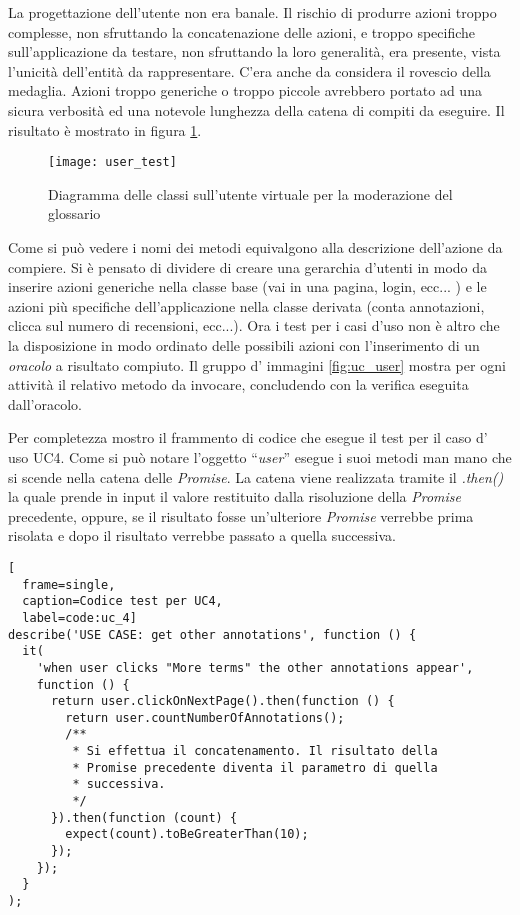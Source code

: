 La progettazione dell'utente non era banale. Il rischio di produrre azioni
troppo complesse, non sfruttando la concatenazione delle azioni, e troppo
specifiche sull'applicazione da testare, non sfruttando la loro generalità,
era presente, vista l'unicità dell'entità da rappresentare. C'era anche da
considera il rovescio della medaglia. Azioni troppo generiche o troppo piccole
avrebbero portato ad una sicura verbosità ed una notevole lunghezza della catena
di compiti da eseguire. Il risultato è mostrato in figura \ref{fig:user_test}.

\begin{figure}[H]
\begin{center}
\texttt{[image: user\_test]}
\caption{
Diagramma delle classi sull'utente virtuale per la moderazione del glossario
}
\label{fig:user_test}
\end{center}
\end{figure}

Come si può vedere i nomi dei metodi equivalgono alla descrizione dell'azione
da compiere. Si è pensato di dividere di creare una gerarchia d'utenti in modo
da inserire azioni generiche nella classe base (vai in una pagina, login, ecc...
) e le azioni più specifiche dell'applicazione nella classe derivata (conta
annotazioni, clicca sul numero di recensioni, ecc...). Ora i test per i casi
d'uso non è altro che la disposizione in modo ordinato delle possibili azioni
con l'inserimento di un \textit{oracolo} a risultato compiuto. Il gruppo d'
immagini \ref{fig:uc_user} mostra per ogni attività il relativo metodo da
invocare, concludendo con la verifica eseguita dall'oracolo.

Per completezza mostro il frammento di codice che esegue il test per il caso d'
uso UC4. Come si può notare l'oggetto ``\textit{user}'' esegue i suoi metodi
man mano che si scende nella catena delle \textit{Promise}. La catena viene
realizzata tramite il \textit{.then()} la quale prende in input il valore
restituito dalla risoluzione della \textit{Promise} precedente, oppure, se il
risultato fosse un'ulteriore \textit{Promise} verrebbe prima risolata e dopo
il risultato verrebbe passato a quella successiva.

\newpage

\begin{center}
\begin{lstlisting}[
  frame=single,
  caption=Codice test per UC4,
  label=code:uc_4]
describe('USE CASE: get other annotations', function () {
  it(
    'when user clicks "More terms" the other annotations appear',
    function () {
      return user.clickOnNextPage().then(function () {
        return user.countNumberOfAnnotations();
        /**
         * Si effettua il concatenamento. Il risultato della
         * Promise precedente diventa il parametro di quella
         * successiva.
         */
      }).then(function (count) {
        expect(count).toBeGreaterThan(10);
      });
    });
  }
);
\end{lstlisting}
\end{center}

